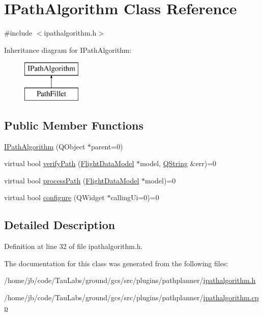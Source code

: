 \hypertarget{class_i_path_algorithm}{\section{\-I\-Path\-Algorithm \-Class \-Reference}
\label{class_i_path_algorithm}
}


{\ttfamily \#include $<$ipathalgorithm.\-h$>$}

\-Inheritance diagram for \-I\-Path\-Algorithm\-:\begin{figure}[H]
\begin{center}
\leavevmode
\includegraphics[height=2.000000cm]{class_i_path_algorithm}
\end{center}
\end{figure}
\subsection*{\-Public \-Member \-Functions}
\begin{DoxyCompactItemize}
\item 
\hyperlink{group___path_gafe016f55fde1369cf1d9301f86b37c2a}{\-I\-Path\-Algorithm} (\-Q\-Object $\ast$parent=0)
\item 
virtual bool \hyperlink{group___path_ga115e5e8fbbb0f1e2a1208be63bafdb5e}{verify\-Path} (\hyperlink{class_flight_data_model}{\-Flight\-Data\-Model} $\ast$model, \hyperlink{group___u_a_v_objects_plugin_gab9d252f49c333c94a72f97ce3105a32d}{\-Q\-String} \&err)=0
\item 
virtual bool \hyperlink{group___path_ga7c93a036e8d5904a4c76444e38ec96b9}{process\-Path} (\hyperlink{class_flight_data_model}{\-Flight\-Data\-Model} $\ast$model)=0
\item 
virtual bool \hyperlink{group___path_ga4157a802d06807c33e402f6a51f9f366}{configure} (\-Q\-Widget $\ast$calling\-Ui=0)=0
\end{DoxyCompactItemize}


\subsection{\-Detailed \-Description}


\-Definition at line 32 of file ipathalgorithm.\-h.



\-The documentation for this class was generated from the following files\-:\begin{DoxyCompactItemize}
\item 
/home/jb/code/\-Tau\-Labs/ground/gcs/src/plugins/pathplanner/\hyperlink{ipathalgorithm_8h}{ipathalgorithm.\-h}\item 
/home/jb/code/\-Tau\-Labs/ground/gcs/src/plugins/pathplanner/\hyperlink{ipathalgorithm_8cpp}{ipathalgorithm.\-cpp}\end{DoxyCompactItemize}
